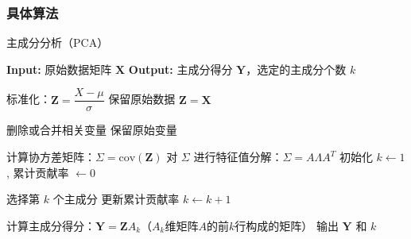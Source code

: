 \subsubsection{具体算法}
\begin{algorithm}[H]
	\caption{主成分分析（PCA）}
	\begin{algorithmic}[1]
		\State \textbf{Input:} 原始数据矩阵 $\mathbf{X}$
		\State \textbf{Output:} 主成分得分 $\mathbf{Y}$，选定的主成分个数 $k$
		
		\State 标准化：$\mathbf{Z} = \dfrac{X - \mu}{\sigma}$
		\Else
		\State 保留原始数据 $\mathbf{Z} = \mathbf{X}$
		\EndIf
		
		\State 删除或合并相关变量
		\Else
		\State 保留原始变量
		\EndIf
		
		\State 计算协方差矩阵：$\Sigma = \text{cov}(\mathbf{Z})$
		\State 对 $\Sigma$ 进行特征值分解：$\Sigma = A \Lambda A^T$
		\State 初始化 $k \gets 1$, 累计贡献率 $\gets 0$
		
		\Repeat
		\State 选择第 $k$ 个主成分
		\State 更新累计贡献率
		\State $k \gets k + 1$
		\EndIf
		
		\State 计算主成分得分：$\mathbf{Y} = \mathbf{Z} A_k$（$A_k$维矩阵$A$的前$k$行构成的矩阵）
		\State 输出 $\mathbf{Y}$ 和 $k$
	\end{algorithmic}
\end{algorithm}








